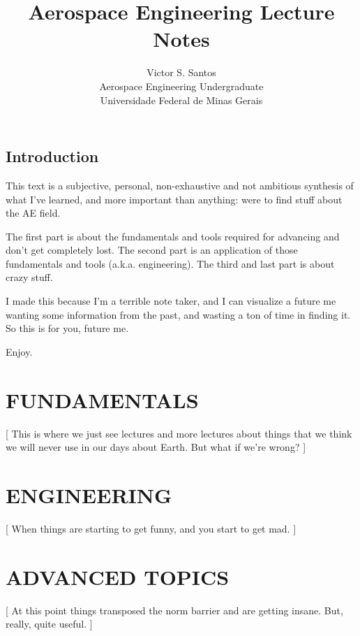 \documentclass{report}
\author{\uppercase Victor S. Santos \\ Aerospace Engineering Undergraduate \\
 Universidade Federal de Minas Gerais}
\title{\uppercase Aerospace Engineering Lecture Notes}
\begin{document}
\maketitle

\thispagestyle{empty}

\tableofcontents

\frontmatter


\chapter*{Introduction}

This text is a subjective, personal, non-exhaustive and
not ambitious synthesis of what I've learned, and more important than
anything: were to find stuff about the AE field.

The first part is about the fundamentals and tools required for 
advancing and don't get completely lost.
The second part is an application of those fundamentals 
and tools (a.k.a. engineering).
The third and last part is about crazy stuff.

I made this because I'm a terrible note taker, and I can visualize
a future me wanting some information from the past, and wasting
a ton of time in finding it. So this is for you, future me.

Enjoy.

\mainmatter

\part{\uppercase{Fundamentals}}
[
This is where we just see lectures and more lectures about things that
we think we will never use in our days about Earth. But what if we're
wrong?
]


\part{\uppercase{Engineering}}
[
When things are starting to get funny, and you 
start to get mad.
]


\part{\uppercase{Advanced Topics}}
[
At this point things transposed the norm barrier
and are getting insane.
But, really, quite useful.
]



\printindex

\end{document}

